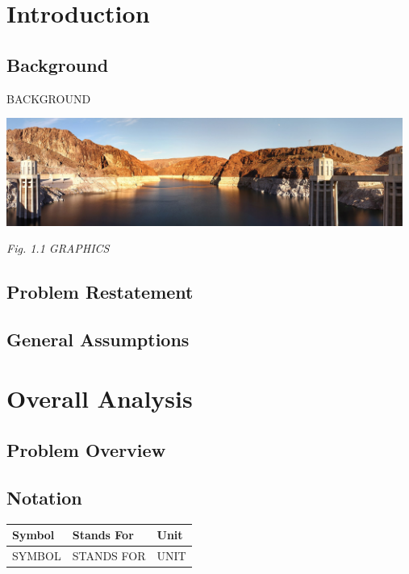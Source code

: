 \documentclass[12pt]{article}
\theoremstyle{definition}
\theoremstyle{remark}
\numberwithin{equation}{section}
\begin{document}
\newpage
\section{Introduction}

	\subsection{Background}
		BACKGROUND \cite{LIKE THIS}


		\begin{center}
		\includegraphics[width=13cm]{1.1 GRAPHICS.jpg}

		\small \textit{Fig. 1.1 GRAPHICS}
		\end{center}

	\subsection{Problem Restatement}

	\subsection{General Assumptions}

\newpage
\section{Overall Analysis}

	\subsection{Problem Overview}
			
	\subsection{Notation}
			\begin{tabular}{lll}
				\hline
				Symbol&Stands For&Unit\\
				\hline
				SYMBOL&STANDS FOR&UNIT\\
				\hline
			\end{tabular}	
		
\end{document}
